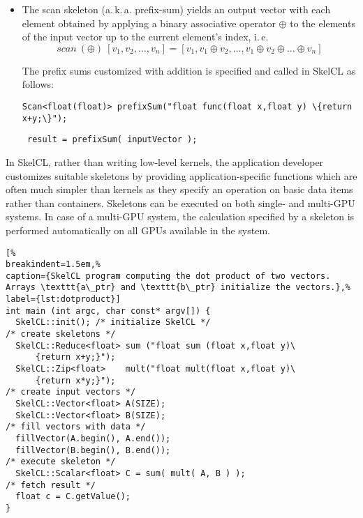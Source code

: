 \begin{itemize}
    \vspace{-.5em}
    For example, to sum up all elements of a vector, the reduce skeleton is created with addition as customizing function, and called as follows:

    \vspace{.5em}
    \centerline{\lstinline!Reduce<float(float)> sumUp("float func(float x,float y) \{ return x+y;\}");!}
    \vspace{.5em}
    \centerline{\lstinline! result = sumUp( inputVector );!}
    \vspace{.5em}

 
  \item The scan skeleton (a.\,k.\,a. prefix-sum) yields an output vector with each element obtained by applying a binary associative operator $\oplus$ to the elements of the input vector up to the current element's index, i.\,e.
    \vspace{-.5em}
    \[ scan\ (\oplus)\ [v_1, v_2, \dots, v_n] = [v_1, v_1\oplus v_2, \dots, v_1\oplus v_2\oplus \dots \oplus v_n] \]

    \vspace{-.5em}
    The prefix sums customized with addition is specified and called in SkelCL as follows:

    \vspace{.5em}
    \centerline{\lstinline!Scan<float(float)> prefixSum("float func(float x,float y) \{return x+y;\}");!}
    \vspace{.5em}
    \centerline{\lstinline! result = prefixSum( inputVector );!}
    \vspace{.5em}

\end{itemize}


In SkelCL, rather than writing low-level kernels, the application developer customizes suitable skeletons by providing application-specific functions which are often much simpler than kernels as they specify an operation on basic data items rather than containers.
Skeletons can be executed on both single- and multi-GPU systems.
In case of a multi-GPU system, the calculation specified by a skeleton is performed automatically on all GPUs available in the system.
\bigskip

\begin{lstlisting}[%
breakindent=1.5em,%
caption={SkelCL program computing the dot product of two vectors. Arrays \texttt{a\_ptr} and \texttt{b\_ptr} initialize the vectors.},%
label={lst:dotproduct}]
int main (int argc, char const* argv[]) {
  SkelCL::init(); /* initialize SkelCL */
/* create skeletons */
  SkelCL::Reduce<float> sum ("float sum (float x,float y)\
      {return x+y;}");
  SkelCL::Zip<float>    mult("float mult(float x,float y)\
      {return x*y;}");
/* create input vectors */
  SkelCL::Vector<float> A(SIZE);
  SkelCL::Vector<float> B(SIZE);
/* fill vectors with data */
  fillVector(A.begin(), A.end());
  fillVector(B.begin(), B.end());
/* execute skeleton */
  SkelCL::Scalar<float> C = sum( mult( A, B ) );
/* fetch result */
  float c = C.getValue();
}
\end{lstlisting}


